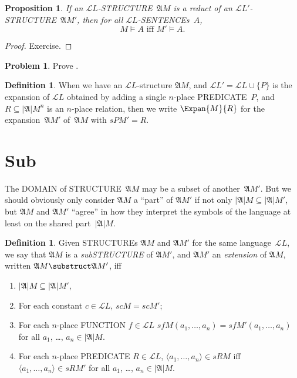 \documentclass[10pt,a4paper]{article}
\makeatletter
\newcommand*{\olup}[1]{\MakeUppercase{#1}}
\theoremstyle{plain}
\newtheorem{prop}[thm]{Proposition}
\theoremstyle{definition}
\newtheorem{defn}[thm]{Definition}
\newtheorem{prob}{Problem}[section]
\theoremstyle{remark}
\newcommand*{\olfileid}[3]{}
\newcommand*{\olsection}[1]{\section*{#1}}
\newcommand*{\ollabel}[1]{\label{#1}}
\newcommand{\olref}{\@ifnextchar[{\olref@i}{\olref@final}}
\def\olref@i[#1]{\@ifnextchar[{\olref@ii}{\olref@final}}
\def\olref@ii[#1]{\@ifnextchar[{\olref@iii}{\olref@final}}
\def\olref@iii[#1]{\olref@final}
\def\olref@final#1{\ref{#1}}
\providecommand{\Struct}{\ensuremath{\mathfrak{A}}}
\providecommand{\Domain}{\ensuremath{|\mathfrak{A}|}}
\providecommand{\Assign}{\ensuremath{s}}
\providecommand{\Sat}[2]{\ensuremath{#1 \models #2}}
\providecommand{\Lang}{\ensuremath{\mathcal{L}}}
\makeatother
\begin{document}
\begin{prop}
\ollabel{prop:reduct}
If an $\Lang{L}$-\olup{structure}~$\Struct{M}$ is a reduct of an
$\Lang{L'}$-\olup{structure}~$\Struct{M'}$, then for all
$\Lang{L}$-\olup{sentence}s~$A$,
\[
\Sat{M}{A} \text{ iff } \Sat{M'}{A}.
\]
\end{prop}

\begin{proof}
  Exercise.
\end{proof}

\begin{prob}
Prove \olref[mod][bas][red]{prop:reduct}.
\end{prob}

\begin{defn}
When we have an $\Lang{L}$-structure $\Struct{M}$, and $\Lang{L'} =
\Lang{L} \cup \{P\}$ is the expansion of $\Lang{L}$ obtained by adding
a single $n$-place \olup{predicate}~$P$, and $R \subseteq \Domain{M}^n$
is an $n$-place relation, then we write $\Expan{M}{R}$ for the
expansion~$\Struct{M'}$ of~$\Struct{M}$ with $\Assign{P}{M'} = R$.
\end{defn}





\olfileid{mod}{bas}{sub}
\olsection{Sub}

The \olup{domain} of \olup{structure}~$\Struct{M}$ may be a subset of
another~$\Struct{M'}$.  But we should obviously only consider
$\Struct{M}$ a ``part'' of $\Struct{M'}$ if not only $\Domain{M}
\subseteq \Domain{M'}$, but $\Struct{M}$ and $\Struct{M'}$ ``agree''
in how they interpret the symbols of the language at least on the
shared part~$\Domain{M}$.

\begin{defn}
\ollabel{defn:substructure}
Given \olup{structure}s $\Struct M$ and $\Struct M'$ for the same
language~$\Lang L$, we say that $\Struct M$ is a \emph{sub\olup{structure}}
of $\Struct M'$, and $\Struct M'$ an \emph{extension} of $\Struct M$,
written $\Struct M \substruct \Struct M'$, iff
\begin{enumerate}
\item $\Domain{M} \subseteq \Domain{M'}$,
\item For each constant $c \in \Lang L$, $\Assign{c}{M} =
    \Assign{c}{M'}$;
\item For each $n$-place \olup{function} $f \in \Lang L$
  $\Assign{f}{M}(a_1, \dots, a_n) = \Assign{f}{M'}(a_1, \dots, a_n)$
  for all $a_1$, \dots, $a_n \in \Domain{M}$.
\item For each $n$-place \olup{predicate} $R \in \Lang L$, $\langle
  a_1, \dots, a_n\rangle \in \Assign{R}{M}$ iff $\langle a_1, \dots,
  a_n\rangle \in \Assign{R}{M'}$ for all $a_1$, \dots, $a_n \in
  \Domain{M}$.
\end{enumerate}
\end{defn}
\end{document}
